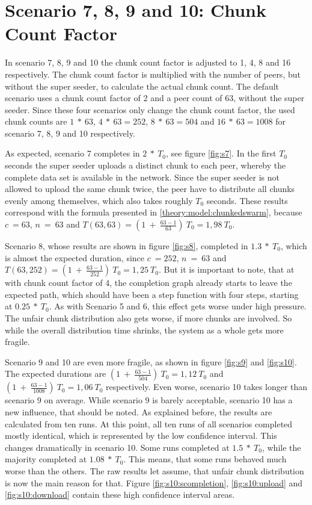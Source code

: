 \pagebreak
\section{Scenario 7, 8, 9 and 10: Chunk Count Factor}
\label{evaluation:78910}

In scenario 7, 8, 9 and 10 the chunk count factor is adjusted to 1, 4, 8 and 16 respectively. The chunk count factor is multiplied with the number of peers, but without the super seeder, to calculate the actual chunk count. The default scenario uses a chunk count factor of 2 and a peer count of 63, without the super seeder. Since these four scenarios only change the chunk count factor, the used chunk counts are $1\:*\:63$, $4\:*\:63=252$, $8\:*\:63=504$ and $16\:*\:63=1008$ for scenario 7, 8, 9 and 10 respectively.   

As expected, scenario 7 completes in $2\:*\:T_0$, see figure \ref{fig:s7}. In the first $T_0$ seconds the super seeder uploads a distinct chunk to each peer, whereby the complete data set is available in the network. Since the super seeder is not allowed to upload the same chunk twice, the peer have to distribute all chunks evenly among themselves, which also takes roughly $T_0$ seconds. These results correspond with the formula presented in \ref{theory:model:chunkedswarm}, because $c\:=63$, $n\:=\:63$ and $T(63, 63) = (1\:+\:\frac{63-1}{63})\:T_0 = 1,98\:T_0$.

Scenario 8, whose results are shown in figure \ref{fig:s8}, completed in $1.3\:*\:T_0$, which is almost the expected duration, since $c\:=252$, $n\:=\:63$ and $T(63, 252) = (1\:+\:\frac{63-1}{252})\:T_0 = 1,25\:T_0$. But it is important to note, that at with chunk count factor of 4, the completion graph already starts to leave the expected path, which should have been a step function with four steps, starting at $0.25\:*\:T_0$. As with Scenario 5 and 6, this effect gets worse under high pressure. The unfair chunk distribution also gets worse, if more chunks are involved. So while the overall distribution time shrinks, the system as a whole gets more fragile.

Scenario 9 and 10 are even more fragile, as shown in figure \ref{fig:s9} and \ref{fig:s10}. The expected durations are $(1\:+\:\frac{63-1}{504})\:T_0 = 1,12\:T_0$ and $(1\:+\:\frac{63-1}{1008})\:T_0 = 1,06\:T_0$ respectively. Even worse, scenario 10 takes longer than scenario 9 on average. While scenario 9 is barely acceptable, scenario 10 has a new influence, that should be noted. As explained before, the results are calculated from ten runs. At this point, all ten runs of all scenarios completed mostly identical, which is represented by the low confidence interval. This changes dramatically in scenario 10. Some runs completed at $1.5\:*\:T_0$, while the majority completed at $1.08\:*\:T_0$. This means, that some runs behaved much worse than the others. The raw results let assume, that unfair chunk distribution is now the main reason for that. Figure \ref{fig:s10:scompletion}, \ref{fig:s10:upload} and \ref{fig:s10:download} contain these high confidence interval areas. 

